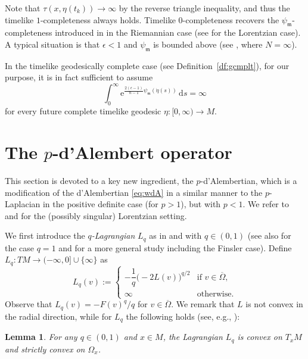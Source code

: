 \documentclass[a4paper,11pt]{article}
\numberwithin{equation}{section}
\theoremstyle{definition}
\theoremstyle{plain}
\newtheorem{lemma}[definition]{Lemma}
\newcommand{\ez}{\epsilon}
\newcommand{\lra}{\longrightarrow}
\newcommand{\e}{\mathrm{e}}
\newcommand{\dd}{\mathrm{d}}
\newcommand{\fm}{\ensuremath{\mathfrak{m}}}
\begin{document}
Note that $\tau(x,\eta(t_k)) \to \infty$ by the reverse triangle inequality, and thus the timelike $1$-completeness always holds.
Timelike $0$-completeness recovers the $\psi_\fm$-completeness introduced in  \cite{Wy}
in the Riemannian case (see  \cite{WW} for the Lorentzian case).
A typical situation is that $\ez<1$ and $\psi_\fm$ is bounded above (see  \cite{Ca}, where $N=\infty$).

In the timelike geodesically complete case (see Definition~\ref{df:gcmplt}), for our purpose, it is in fact sufficient to assume
\begin{equation}\label{eq:cmplt}
\int_0^\infty \e^{\frac{2(\ez -1)}{n-1} \psi_\fm(\dot{\eta}(s))} \,\dd s =\infty
\end{equation}
for every future complete timelike geodesic $\eta\colon [0,\infty) \lra M$.

\section{The $p$-d'Alembert operator}\label{sc:p-dA}

This section is devoted to a key new ingredient, the $p$-d'Alembertian, which is a modification of the d'Alembertian \eqref{eq:wdA} in a similar manner to the $p$-Laplacian in the positive definite case (for $p>1$), but with $p<1$.
We refer to \cite{octet,Br,quintet} and \cite{McCann:2020,MS:22} for the (possibly singular) Lorentzian setting.

We first introduce the \emph{$q$-Lagrangian} $L_q$ as in  \cite{McCann:2020} and  \cite{BO} with $q \in (0,1)$ (see also  \cite{Suhr} for the case $q=1$ and  \cite[\S 3.1]{Min-causality} for a more general study including the Finsler case).
Define $L_q\colon TM \lra (-\infty,0] \cup \{\infty\}$ as
\begin{equation*}%
L_q(v) := \begin{cases}
 -\dfrac{1}{q} \bigl( -2L(v) \bigr)^{q/2} & \text{if } v \in \overline{\Omega}, \\
 \infty & \text{otherwise}.
\end{cases}
\end{equation*}
Observe that $L_q(v) =-F(v)^q/q$ for $v \in \overline{\Omega}$.
We remark that  $L$  is not convex in the radial direction,
while  for $L_q$ the following holds (see, e.g., \cite[Lemma~3.1]{BO}):
\begin{lemma}\label{lm:Lag}
For any $q \in (0,1)$ and $x \in M$, the Lagrangian $L_q$ is convex on $T_xM$ and strictly convex on $\Omega_x$.
\end{lemma}
\end{document}
